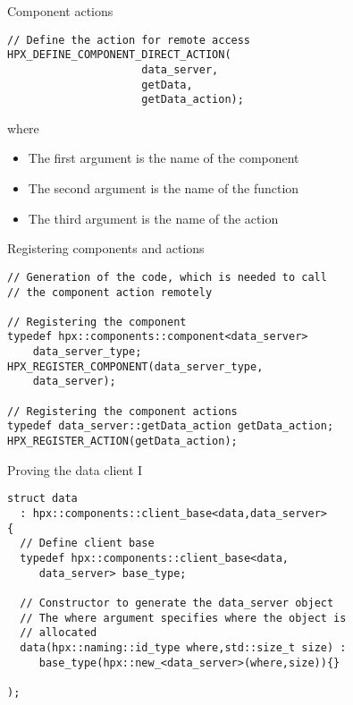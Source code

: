 \documentclass[\classoption]{beamer}
\begin{document}
\begin{frame}[fragile]{Component actions}

\begin{lstlisting}
// Define the action for remote access
HPX_DEFINE_COMPONENT_DIRECT_ACTION(
                     data_server,
                     getData,
                     getData_action);
\end{lstlisting}
where
\begin{itemize}
\item The first argument is the name of the component
\item The second argument is the name of the function
\item The third argument is the name of the action
\end{itemize}
\end{frame}

\begin{frame}[fragile]{Registering components and actions}

\begin{lstlisting}
// Generation of the code, which is needed to call 
// the component action remotely

// Registering the component
typedef hpx::components::component<data_server> 
    data_server_type;
HPX_REGISTER_COMPONENT(data_server_type, 
    data_server);
    
// Registering the component actions
typedef data_server::getData_action getData_action;
HPX_REGISTER_ACTION(getData_action);
\end{lstlisting}

\end{frame}

\begin{frame}[fragile]{Proving the data client I}

\begin{lstlisting}
struct data
  : hpx::components::client_base<data,data_server>
{
  // Define client base
  typedef hpx::components::client_base<data, 
     data_server> base_type;
  
  // Constructor to generate the data_server object
  // The where argument specifies where the object is
  // allocated
  data(hpx::naming::id_type where,std::size_t size) :
     base_type(hpx::new_<data_server>(where,size)){}
        
);
\end{lstlisting}

\end{frame}
\end{document}
